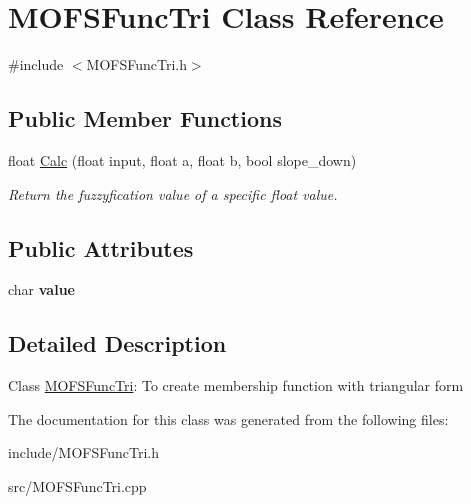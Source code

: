 \hypertarget{classMOFSFuncTri}{\section{M\-O\-F\-S\-Func\-Tri Class Reference}
\label{classMOFSFuncTri}
}


{\ttfamily \#include $<$M\-O\-F\-S\-Func\-Tri.\-h$>$}

\subsection*{Public Member Functions}
\begin{DoxyCompactItemize}
\item 
\hypertarget{classMOFSFuncTri_a5474015058c38d9d80b69eb411f82567}{float \hyperlink{classMOFSFuncTri_a5474015058c38d9d80b69eb411f82567}{Calc} (float input, float a, float b, bool slope\-\_\-down)}\label{classMOFSFuncTri_a5474015058c38d9d80b69eb411f82567}

\begin{DoxyCompactList}\small\item\em Return the fuzzyfication value of a specific float value. \end{DoxyCompactList}\end{DoxyCompactItemize}
\subsection*{Public Attributes}
\begin{DoxyCompactItemize}
\item 
\hypertarget{classMOFSFuncTri_a2c23f2d2ae2bcfc34a61ccf7c3245561}{char {\bfseries value}}\label{classMOFSFuncTri_a2c23f2d2ae2bcfc34a61ccf7c3245561}

\end{DoxyCompactItemize}


\subsection{Detailed Description}
Class \hyperlink{classMOFSFuncTri}{M\-O\-F\-S\-Func\-Tri}\-: To create membership function with triangular form 

The documentation for this class was generated from the following files\-:\begin{DoxyCompactItemize}
\item 
include/M\-O\-F\-S\-Func\-Tri.\-h\item 
src/M\-O\-F\-S\-Func\-Tri.\-cpp\end{DoxyCompactItemize}
